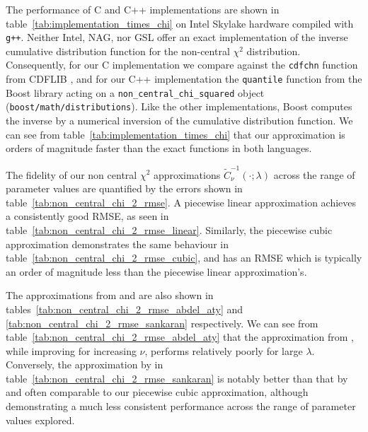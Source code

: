 \documentclass[9pt,a4paper,english]{extarticle}
\begin{document}
The performance of C and C++ implementations are shown in table~\ref{tab:implementation_times_chi} on Intel Skylake hardware compiled with \texttt{g++}. Neither Intel, NAG, nor GSL offer an exact implementation of the inverse cumulative distribution function for the non-central $ \chi^2 $ distribution. Consequently, for our C implementation we compare against the \texttt{cdfchn} function from CDFLIB \citep{brown1994dcdflib,burkardt2020cdflib}, and for our C++ implementation the \texttt{quantile} function from the Boost library \citep{boost2020library} acting on a \texttt{non\_central\_chi\_squared} object (\texttt{boost/math/distributions}). Like the other implementations, Boost computes the inverse by a numerical inversion of the cumulative distribution function. We can see from table~\ref{tab:implementation_times_chi} that our approximation is orders of magnitude faster than the exact functions in both languages. 


The fidelity of our non central $\chi^2$ approximations $ \widetilde{C}^{-1}_{\nu}(\cdot;\lambda) $ across the range of parameter values are quantified by the errors shown in table~\ref{tab:non_central_chi_2_rmse}. A piecewise linear approximation achieves a consistently good RMSE, as seen in table~\ref{tab:non_central_chi_2_rmse_linear}. Similarly, the piecewise cubic approximation demonstrates the same behaviour in table~\ref{tab:non_central_chi_2_rmse_cubic}, and has an RMSE which is typically an order of magnitude less than the piecewise linear approximation's. 

The approximations from \citet{abdel1954approximate} and \citet{sankaran1959non} are also shown in tables~\ref{tab:non_central_chi_2_rmse_abdel_aty} and \ref{tab:non_central_chi_2_rmse_sankaran} respectively. We can see from table~\ref{tab:non_central_chi_2_rmse_abdel_aty} that the approximation from \citeauthor{abdel1954approximate}, while improving for increasing $ \nu $, performs relatively poorly for large $ \lambda $. Conversely, the approximation by \citeauthor{sankaran1959non} in table~\ref{tab:non_central_chi_2_rmse_sankaran} is notably better than that by \citeauthor{abdel1954approximate} and often comparable to our piecewise cubic approximation, although demonstrating a much less consistent performance across the range of parameter values explored. 
\end{document}

